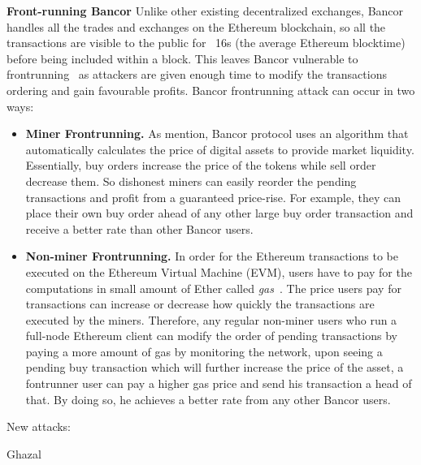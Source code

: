 \par\noindent\textbf{Front-running Bancor} Unlike other existing decentralized exchanges, Bancor handles all the trades and exchanges on the Ethereum blockchain, so all the transactions are visible to the public for ~16s (the average Ethereum blocktime) before being included within a block. This leaves Bancor vulnerable to frontrunning~\cite{BancorIs7:online} as attackers are given enough time to modify the transactions ordering and gain favourable profits. Bancor frontrunning attack can occur in two ways:
\begin{itemize}
\item {\textbf{Miner Frontrunning.}} As mention, Bancor protocol uses an algorithm that automatically calculates the price of digital assets to provide market liquidity. Essentially, buy orders increase the price of the tokens while sell order decrease them. So  dishonest miners can easily reorder the pending transactions and  profit from a guaranteed price-rise. For example, they can place their own buy order ahead of any other large buy order transaction and receive a better rate than other Bancor users. 
\item {\textbf{Non-miner Frontrunning.}} In order for the Ethereum transactions to be executed on the Ethereum Virtual Machine (EVM), users have to pay for the computations in small amount of Ether called \textit{gas}~\cite{AccountT67:online}.  The price users pay for transactions can increase or decrease how quickly the transactions are executed by the miners. Therefore, any regular non-miner users who run a full-node Ethereum client can modify the order of pending transactions by paying a more amount of gas \ie by monitoring the network, upon seeing a  pending buy transaction which will further increase the price of the asset, a fontrunner user can pay a higher gas price and send his transaction a head of that. By doing so, he achieves a better rate from any other Bancor users.
\end{itemize}
 
 

 
 
New attacks:\par\noindent
Ghazal\par\noindent

